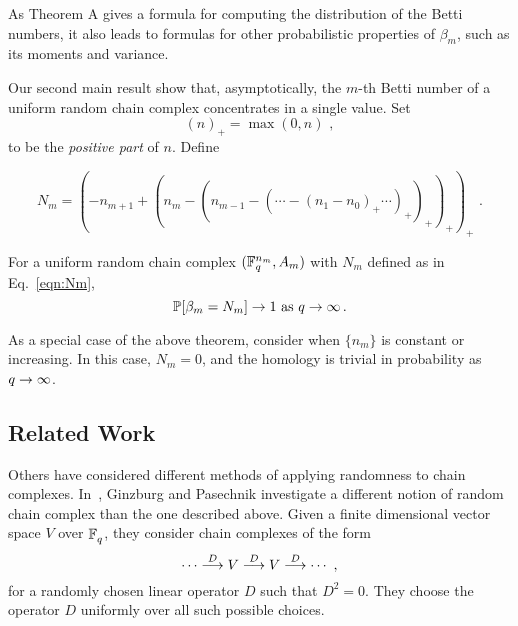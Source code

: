  As Theorem A gives a formula for computing the distribution of the Betti numbers, it also leads to formulas for other probabilistic properties of $\beta_m$, such as its moments and variance.

Our second main result show that, asymptotically, the $m$-th Betti number of a uniform random chain complex concentrates in a single value. Set
\begin{equation*}
  (n)_+ = \max(0,n) \, \, , %
\end{equation*}
to be the {\em positive part} of $n$.
Define

\begin{equation}
  N_m = (-n_{m+1} + (n_m - (n_{m-1} - (\cdots - (n_1 - n_0)_+ \cdots)_+ )_+
  )_+)_+ \, \, .
  \label{eqn:Nm}
\end{equation}


\begin{bigthm}
  \label{thm:qtoinfty}
  For a uniform random chain complex $(\mathbb{F}_q^{n_m},A_m)$ with $N_m$ defined as in Eq.~\eqref{eqn:Nm},
  \[
    \mathbb{P}[\beta_m = N_m] \rightarrow 1 
    \mbox{ as } q \rightarrow \infty  \, .
  \]
\end{bigthm}


\begin{remark}
  \label{rem:monotone}
  As a special case of the above theorem, consider when $\{n_m\}$
  is constant or increasing. In this case, 
  $N_m = 0$, and the homology is trivial in probability as $q \rightarrow \infty$.  
\end{remark}

\subsection*{Related Work} Others have considered different methods of applying randomness to chain complexes. In~\cite{ginzburg2017random}, Ginzburg and Pasechnik investigate
a different  notion of random chain complex than the one described above.
Given a finite dimensional vector space $V$ over $\mathbb{F}_q^{}$, they consider chain
complexes of the form
\[
  \cdots \stackrel{D}{\longrightarrow} V \stackrel{D}{\longrightarrow} V \stackrel{D}{\longrightarrow} \cdots \, \, ,
\]
for a randomly chosen linear operator $D$ such that $D^2 = 0$. They choose the 
operator $D$ uniformly over all such possible choices. 

